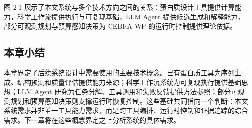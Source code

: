 图 2-1
展示了本文系统与多个技术方向之间的关系：蛋白质设计工具提供计算能力，科学工作流提供执行与可复现基础，LLM
Agent 提供候选生成和解释能力，部分可观测规划与预算感知决策为 CEBRA-WP
的运行时控制提供理论依据。

\subsection{本章小结}\label{related-work-summary}

本章界定了后续系统设计中需要使用的主要技术概念。已有蛋白质工具为序列生成、结构预测和质量评估提供能力来源；科学工作流系统为可复现执行提供基础思想；LLM
Agent
研究为任务分解、工具调用和失败反馈提供方法参照；部分可观测规划和预算感知决策则支撑运行时恢复控制。这些基础共同指向一个判断：本文系统需求并非单一工具能力需求，而是跨工具编排、运行时控制和证据追踪的综合需求。下一章将在这些概念界定之上分析系统的具体需求。
